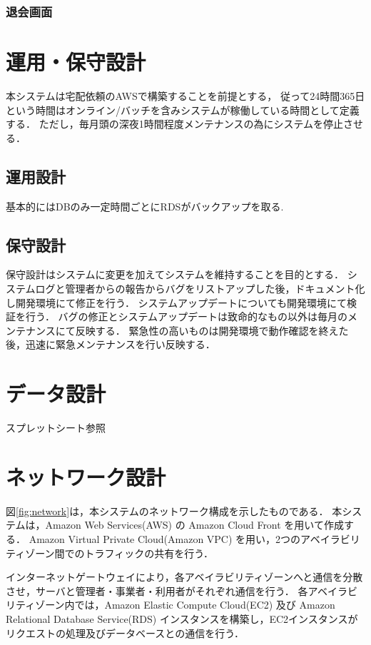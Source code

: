 \documentclass[a4paper, titlepage]{jsarticle}
\begin{document}
\subsubsection{退会画面}

\section{運用・保守設計}
本システムは宅配依頼のAWSで構築することを前提とする，
従って24時間365日という時間はオンライン/バッチを含みシステムが稼働している時間として定義する．
ただし，毎月頭の深夜1時間程度メンテナンスの為にシステムを停止させる．
\subsection{運用設計}
基本的にはDBのみ一定時間ごとにRDSがバックアップを取る.

\subsection{保守設計}
保守設計はシステムに変更を加えてシステムを維持することを目的とする．
システムログと管理者からの報告からバグをリストアップした後，ドキュメント化し開発環境にて修正を行う．
システムアップデートについても開発環境にて検証を行う．
バグの修正とシステムアップデートは致命的なもの以外は毎月のメンテナンスにて反映する．
緊急性の高いものは開発環境で動作確認を終えた後，迅速に緊急メンテナンスを行い反映する．
\section{データ設計}
スプレットシート参照
\section{ネットワーク設計}
図\ref{fig:network}は，本システムのネットワーク構成を示したものである．
本システムは，Amazon Web Services(AWS) の Amazon Cloud Front を用いて作成する．
Amazon Virtual Private Cloud(Amazon VPC) を用い，2つのアベイラビリティゾーン間でのトラフィックの共有を行う．

インターネットゲートウェイにより，各アベイラビリティゾーンへと通信を分散させ，サーバと管理者・事業者・利用者がそれぞれ通信を行う．
各アベイラビリティゾーン内では，Amazon Elastic Compute Cloud(EC2) 及び Amazon Relational Database Service(RDS) インスタンスを構築し，EC2インスタンスがリクエストの処理及びデータベースとの通信を行う．
\end{document}
